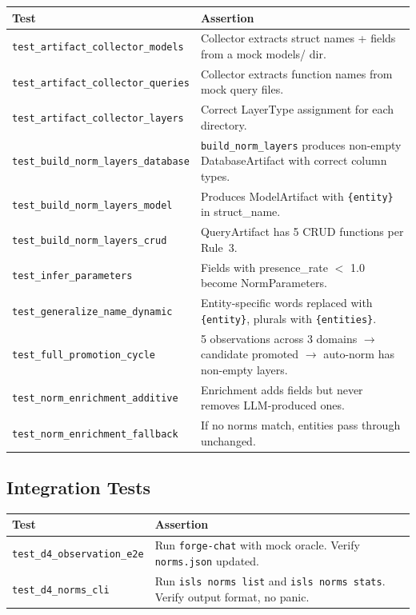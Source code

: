 \documentclass[11pt,a4paper]{article}
\begin{document}
\begin{longtable}{lp{10cm}}
\toprule
\textbf{Test} & \textbf{Assertion} \\
\midrule
\texttt{test\_artifact\_collector\_models} 
  & Collector extracts struct names + fields from a mock models/ dir. \\
\texttt{test\_artifact\_collector\_queries} 
  & Collector extracts function names from mock query files. \\
\texttt{test\_artifact\_collector\_layers} 
  & Correct LayerType assignment for each directory. \\
\texttt{test\_build\_norm\_layers\_database} 
  & \texttt{build\_norm\_layers} produces non-empty DatabaseArtifact 
    with correct column types. \\
\texttt{test\_build\_norm\_layers\_model} 
  & Produces ModelArtifact with \texttt{\{entity\}} in struct\_name. \\
\texttt{test\_build\_norm\_layers\_crud} 
  & QueryArtifact has 5 CRUD functions per Rule~3. \\
\texttt{test\_infer\_parameters} 
  & Fields with presence\_rate $<$ 1.0 become NormParameters. \\
\texttt{test\_generalize\_name\_dynamic} 
  & Entity-specific words replaced with \texttt{\{entity\}}, 
    plurals with \texttt{\{entities\}}. \\
\texttt{test\_full\_promotion\_cycle} 
  & 5 observations across 3 domains $\to$ candidate promoted $\to$ 
    auto-norm has non-empty layers. \\
\texttt{test\_norm\_enrichment\_additive} 
  & Enrichment adds fields but never removes LLM-produced ones. \\
\texttt{test\_norm\_enrichment\_fallback} 
  & If no norms match, entities pass through unchanged. \\
\bottomrule
\end{longtable}

\subsection{Integration Tests}

\begin{longtable}{lp{10cm}}
\toprule
\textbf{Test} & \textbf{Assertion} \\
\midrule
\texttt{test\_d4\_observation\_e2e} 
  & Run \texttt{forge-chat} with mock oracle. Verify 
    \texttt{norms.json} updated. \\
\texttt{test\_d4\_norms\_cli} 
  & Run \texttt{isls norms list} and \texttt{isls norms stats}. 
    Verify output format, no panic. \\
\bottomrule
\end{longtable}
\end{document}
